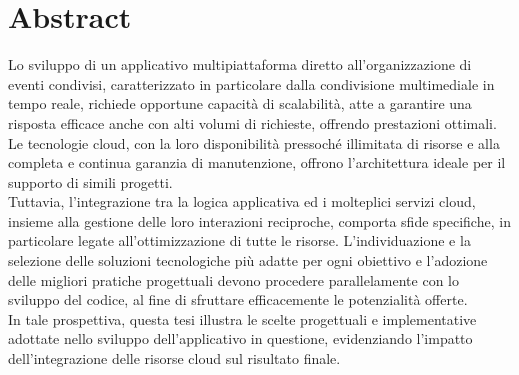 

\section*{Abstract}


Lo sviluppo di un applicativo multipiattaforma diretto all’organizzazione di eventi condivisi, 
caratterizzato in particolare dalla condivisione multimediale in tempo reale, richiede opportune capacità di scalabilità, 
atte a garantire una risposta efficace anche con alti volumi di richieste, offrendo prestazioni ottimali. 
Le tecnologie cloud, con la loro disponibilità pressoché illimitata di risorse e alla completa e continua garanzia  di manutenzione, 
offrono l'architettura ideale per il supporto di simili progetti. \\
Tuttavia, l'integrazione tra la logica applicativa ed i molteplici servizi cloud, insieme alla gestione delle loro interazioni reciproche, 
comporta sfide specifiche, in particolare legate all'ottimizzazione di tutte le risorse. 
L’individuazione e la selezione delle soluzioni tecnologiche più adatte per ogni obiettivo
e l'adozione delle migliori pratiche progettuali devono procedere parallelamente con lo sviluppo del codice, al fine di sfruttare efficacemente le potenzialità offerte. \\
In tale prospettiva, questa tesi illustra le scelte progettuali e implementative adottate nello sviluppo dell'applicativo in questione, 
evidenziando l’impatto dell'integrazione delle risorse cloud sul risultato finale.
\clearpage